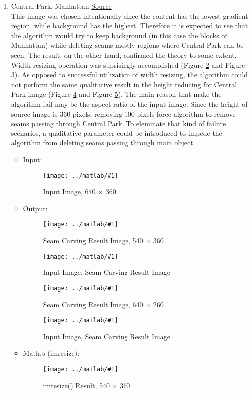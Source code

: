 \documentclass{article}
\newcommand{\listFigure}[3]{ \begin{figure}[H]
\texttt{[image: ../matlab/\#1]}
		\caption{#2\label{fig:#3}}
	\end{figure}		
}
\begin{document}
\begin{enumerate}
\begin{enumerate}
		\item Central Park, Manhattan
		\href{http://animalnewyork.com/2013/awesome-map/}{Source} \\
		This image was chosen intentionally since the content has the lowest gradient
		region, while background has the highest. Therefore it is expected to see that
		the algorithm would try to keep background (in this case the blocks of
		Manhattan) while deleting seams mostly regions where Central Park can be seen.
		The result, on the other hand, confirmed the theory to some extent. Width
		resizing operation was suprisingly accomplished
		(Figure-\ref{fig:outputManhattanW} and Figure-\ref{fig:outputManhattanIOW}).
		As opposed to successful utilization of width resizing, the algorithm could
		not perform the same qualitative result in the height reducing for Central
		Park image (Figure-\ref{fig:outputManhattanH} and
		Figure-\ref{fig:outputManhattanIOH}). The main reason that make the algorithm
		fail may be the aspect ratio of the input image. Since the height of source
		image is 360 pixels, removing 100 pixels force algorithm to remove seams
		passing through Central Park. To eleminate that kind of failure scenarios, a
		qualitative parameter could be introduced to impede the algorithm from
		deleting seams passing through main object.  
		\begin{itemize}
			\item Input:
			\listFigure{Manhattan/inputManhattan.jpg}{Input Image, 640 $\times$
			360}{inputManhattan}
			\item Output:
			\listFigure{Manhattan/outputManhattanW.png}{Seam Carving Result Image, 540
			$\times$ 360}{outputManhattanW} 
			\listFigure{Manhattan/outputIOW.png}{Input Image, Seam Carving
			Result Image}{outputManhattanIOW}
			\listFigure{Manhattan/outputManhattanH.png}{Seam Carving Result Image, 640
			$\times$ 260}{outputManhattanH} 
			\listFigure{Manhattan/outputIOH.png}{Input Image, Seam Carving
			Result Image}{outputManhattanIOH}
			\item Matlab (imresize): 
			\listFigure{Manhattan/outputManhattanMatlab.png}{imresize() Result, 540
			$\times$ 360}{outputManhattanMatlab} 
		\end{itemize}
		

\end{enumerate}
\end{enumerate}
\end{document}
